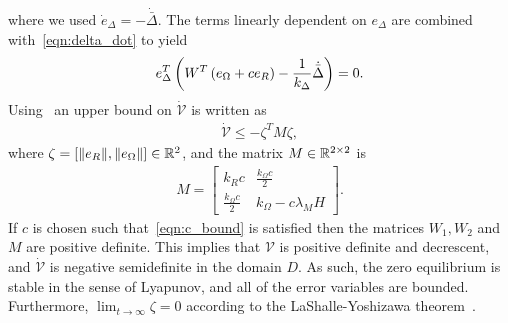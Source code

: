 \documentclass[10pt,fleqn]{IJCAS}  %
\begin{document}
\begin{multicols}{2}
\begin{align}
\end{align}
where we used \( \dot{e}_\Delta = - \dot{\bar{\Delta}} \).
The terms linearly dependent on \( e_\Delta\) are combined with~\cref{eqn:delta_dot} to yield
\begin{align*}
	 e_\Delta^T \left( W^T \left( e_\Omega + c e_R \right) - \frac{1}{k_\Delta} \dot{\bar{\Delta}} \right) = 0 . 
\end{align*}
Using~ an upper bound on \( \dot{\mathcal{V}} \) is written as
\begin{gather*}
	\dot{\mathcal{V}} \leq -\zeta^T M \zeta ,
\end{gather*}
where $\zeta=[\|e_R\|,\|e_\Omega\|]\in\mathbb{R}^2$, and the matrix \( M \in \mathbb{R}^{2 \times 2} \) is 
\begin{gather*}
	M = \begin{bmatrix}
		k_R c & \frac{k_\Omega c}{2} \\
		\frac{k_\Omega c}{2} & k_\Omega - c \lambda_M H
	\end{bmatrix} .
\end{gather*}
If \( c \) is chosen such that~\cref{eqn:c_bound} is satisfied then the matrices \( W_1, W_2 \) and \( M \) are positive definite.
This implies that $\mathcal{V}$ is positive definite and decrescent, and $\dot{\mathcal{V}}$ is negative semidefinite in the domain $D$. As such, the zero equilibrium is stable in the sense of Lyapunov, and all of the error variables are bounded. Furthermore, $\lim_{t\to\infty} \zeta=0$ according to the LaShalle-Yoshizawa theorem~\cite{khalil1996}. 

%	
%	


\end{multicols}
\end{document}
